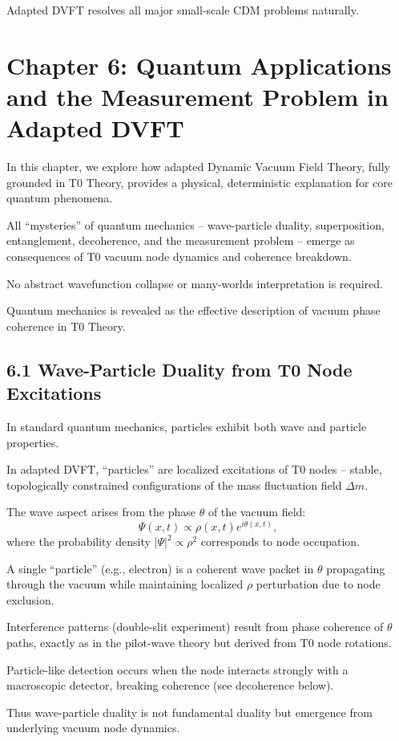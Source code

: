 \documentclass[12pt,a4paper]{article}
\begin{document}
	Adapted DVFT resolves all major small-scale CDM problems naturally.
	
	\section{Chapter 6: Quantum Applications and the Measurement Problem in Adapted DVFT}
	
	In this chapter, we explore how adapted Dynamic Vacuum Field Theory, fully grounded in T0 Theory, provides a physical, deterministic explanation for core quantum phenomena.
	
	All ``mysteries'' of quantum mechanics – wave-particle duality, superposition, entanglement, decoherence, and the measurement problem – emerge as consequences of T0 vacuum node dynamics and coherence breakdown.
	
	No abstract wavefunction collapse or many-worlds interpretation is required.
	
	Quantum mechanics is revealed as the effective description of vacuum phase coherence in T0 Theory.
	
	\subsection{6.1 Wave-Particle Duality from T0 Node Excitations}
	
	In standard quantum mechanics, particles exhibit both wave and particle properties.
	
	In adapted DVFT, ``particles'' are localized excitations of T0 nodes – stable, topologically constrained configurations of the mass fluctuation field $\Delta m$.
	
	The wave aspect arises from the phase $\theta$ of the vacuum field:
	\[
	\Psi(x,t) \propto \rho(x,t) e^{i\theta(x,t)},
	\]
	where the probability density $|\Psi|^2 \propto \rho^2$ corresponds to node occupation.
	
	A single ``particle'' (e.g., electron) is a coherent wave packet in $\theta$ propagating through the vacuum while maintaining localized $\rho$ perturbation due to node exclusion.
	
	Interference patterns (double-slit experiment) result from phase coherence of $\theta$ paths, exactly as in the pilot-wave theory but derived from T0 node rotations.
	
	Particle-like detection occurs when the node interacts strongly with a macroscopic detector, breaking coherence (see decoherence below).
	
	Thus wave-particle duality is not fundamental duality but emergence from underlying vacuum node dynamics.
	
\end{document}
